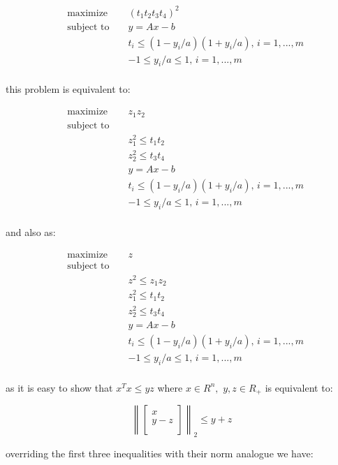 \documentclass{article}
\begin{document}
\begin{align*}
&\text{maximize } && (t_1 t_2 t_3 t_4)^2 \\
&\text{subject to } && y = A x - b \\
& && t_i \leq (1 - y_i / a)(1 + y_i / a),
\, i = 1, ..., m\\
& && -1 \leq y_i / a \leq 1, \, i = 1, ..., m\\
\end{align*}

this problem is equivalent to:

\begin{align*}
&\text{maximize } && z_1 z_2 \\
&\text{subject to } && \\
& && z_1^2 \leq t_1 t_2 \\
& && z_2^2 \leq t_3 t_4 \\
& && y = A x - b \\
& && t_i \leq (1 - y_i / a)(1 + y_i / a),
\, i = 1, ..., m\\
& && -1 \leq y_i / a \leq 1, \, i = 1, ..., m\\
\end{align*}

and also as:

\begin{align*}
&\text{maximize } && z \\
&\text{subject to } && \\
& && z^2 \leq z_1 z_2\\
& && z_1^2 \leq t_1 t_2 \\
& && z_2^2 \leq t_3 t_4 \\
& && y = A x - b \\
& && t_i \leq (1 - y_i / a)(1 + y_i / a),
\, i = 1, ..., m\\
& && -1 \leq y_i / a \leq 1, \, i = 1, ..., m\\
\end{align*}

as it is easy to show that $x^T x \leq yz$ where 
$x \in R^n, $ $y, z \in R_+$ is equivalent to:

$$
\left\lVert
\begin{bmatrix}
	x \\ y - z\\
\end{bmatrix}
\right\rVert_2 \leq y + z
$$

overriding the first three inequalities with their norm analogue we have:
\end{document}
